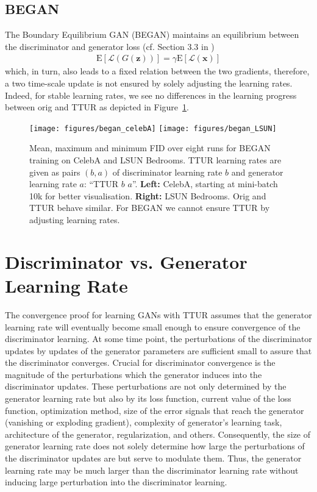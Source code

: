 \documentclass{article}
\newcommand\Bx{\bm{x}}
\newcommand\Bz{\bm{z}}
\newcommand\EXP{\mathbf{\mathrm{E}}}
\begin{document}
\subsection{BEGAN}
The Boundary Equilibrium GAN (BEGAN) \cite{Berthelot:17} maintains an
equilibrium between the discriminator and generator loss (cf. Section 3.3 in
\cite{Berthelot:17})
\begin{align}
\EXP[\mathcal{L}(G(\Bz))] = \gamma \EXP [\mathcal{L}(\Bx)]
\end{align}
which, in turn, also leads to a fixed relation
between the two gradients, therefore, a two time-scale update is not ensured by
solely adjusting the learning rates. Indeed, for stable learning rates, we see
no differences in the learning progress between orig and TTUR as depicted in Figure~\ref{fig:began}.

\begin{figure}[H]
\centering
\texttt{[image: figures/began\_celebA]}
\texttt{[image: figures/began\_LSUN]} \caption[FID for
BEGAN trained on CelebA and LSUN Bedrooms.]{Mean, maximum and minimum FID over eight
runs for BEGAN training on CelebA and LSUN Bedrooms. TTUR learning rates are
given as pairs $(b,a)$ of discriminator learning rate $b$ and generator learning
rate $a$: ``TTUR $b$ $a$''.
{\bf Left:} CelebA, starting at mini-batch 10k for better visualisation. {\bf
Right:} LSUN Bedrooms.
Orig and TTUR behave similar. For BEGAN we cannot ensure TTUR by
adjusting learning rates.
  \label{fig:began} }
\end{figure}

\section{Discriminator vs. Generator Learning Rate}
\label{sec:lr}

The convergence proof for learning GANs with TTUR
assumes that the generator learning rate
will eventually become small enough to ensure
convergence of the discriminator learning.
At some time point, the perturbations of the discriminator updates
by updates of the generator parameters are sufficient small
to assure that the discriminator converges.
Crucial for discriminator convergence is the magnitude of the
perturbations which the generator induces into the
discriminator updates.
These perturbations are not only determined by the generator learning
rate but also by its loss function, current value of the loss
function, optimization method, size of the
error signals that reach the generator (vanishing or exploding
gradient), complexity of generator's learning task, architecture of
the generator, regularization, and others.
Consequently, the size of generator learning rate
does not solely determine how
large the perturbations of the discriminator updates are but serve to
modulate them.
Thus, the generator learning rate may be much larger than the
discriminator learning rate without inducing large perturbation into
the discriminator learning.
\end{document}
